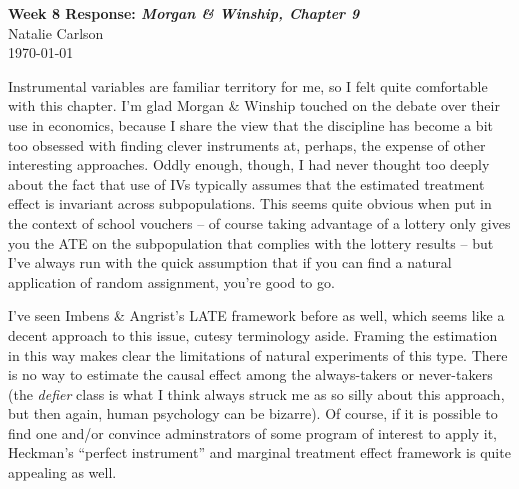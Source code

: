 \documentclass[12pt]{article}
\begin{document}
\begin{center}
  \Large \textbf{Week 8 Response: \textit{Morgan \& Winship, Chapter 9}} \\
  \vspace{0.1in}
  \normalsize Natalie Carlson \\
  \today
\end{center}

Instrumental variables are familiar territory for me, so I felt quite comfortable with this chapter. I'm glad Morgan \& Winship touched on the debate over their use in economics, because I share the view that the discipline has become a bit too obsessed with finding clever instruments at, perhaps, the expense of other interesting approaches. Oddly enough, though, I had never thought too deeply about the fact that use of IVs typically assumes that the estimated treatment effect is invariant across subpopulations. This seems quite obvious when put in the context of school vouchers -- of course taking advantage of a lottery only gives you the ATE on the subpopulation that complies with the lottery results -- but I've always run with the quick assumption that if you can find a natural application of random assignment, you're good to go.

I've seen Imbens \& Angrist's LATE framework before as well, which seems like a decent approach to this issue, cutesy terminology aside. Framing the estimation in this way makes clear the limitations of natural experiments of this type. There is no way to estimate the causal effect among the always-takers or never-takers (the \textit{defier} class is what I think always struck me as so silly about this approach, but then again, human psychology can be bizarre). Of course, if it is possible to find one and/or convince adminstrators of some program of interest to apply it, Heckman's ``perfect instrument'' and marginal treatment effect framework is quite appealing as well. 
\end{document}
